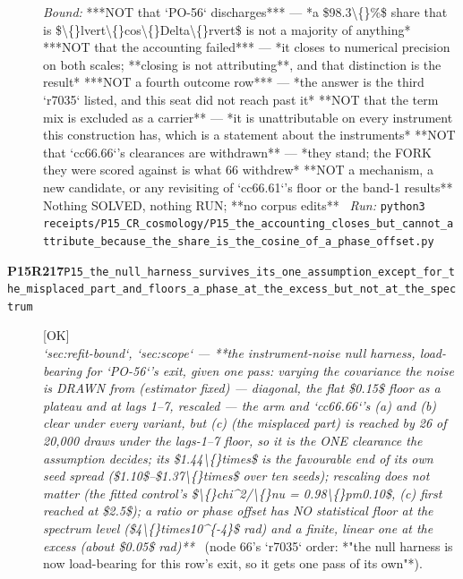 \begin{description}
 \emph{Bound:}  ***NOT that `PO-56` discharges*** --- *a \$98.3\textbackslash\{\}\%\$ share that is \$\textbackslash\{\}lvert\textbackslash\{\}cos\textbackslash\{\}Delta\textbackslash\{\}rvert\$ is not a majority of anything*  ***NOT that the accounting failed*** --- *it closes to numerical precision on both scales; **closing is not attributing**, and that distinction is the result*  ***NOT a fourth outcome row*** --- *the answer is the third `r7035` listed, and this seat did not reach past it*  **NOT that the term mix is excluded as a carrier** --- *it is unattributable on every instrument this construction has, which is a statement about the instruments*  **NOT that `cc66.66`'s clearances are withdrawn** --- *they stand; the FORK they were scored against is what 66 withdrew*  **NOT a mechanism, a new candidate, or any revisiting of `cc66.61`'s floor or the band-1 results**  Nothing SOLVED, nothing RUN; **no corpus edits**
\ \emph{Run:} \texttt{python3 receipts/P15\_CR\_cosmology/P15\_the\_accounting\_closes\_but\_cannot\_attribute\_because\_the\_share\_is\_the\_cosine\_of\_a\_phase\_offset.py}
\item[\rcptlabel{P15_the_null_harness_survives_its_one_assumption_except_for_the_misplaced_part_and_floors_a_phase_at_the_excess_but_not_at_the_spectrum}{P15R217}\textbf{P15R217}\quad\texttt{P15\_the\_null\_harness\_survives\_its\_one\_assumption\_except\_for\_the\_misplaced\_part\_and\_floors\_a\_phase\_at\_the\_excess\_but\_not\_at\_the\_spectrum}]\hfill\textsf{[OK]}\\
\textit{`sec:refit-bound`, `sec:scope` --- **the instrument-noise null harness, load-bearing for `PO-56`'s exit, given one pass: varying the covariance the noise is DRAWN from (estimator fixed) --- diagonal, the flat \$0.15\$ floor as a plateau and at lags 1--7, rescaled --- the arm and `cc66.66`'s (a) and (b) clear under every variant, but (c) (the misplaced part) is reached by 26 of 20,000 draws under the lags-1--7 floor, so it is the ONE clearance the assumption decides; its \$1.44\textbackslash\{\}times\$ is the favourable end of its own seed spread (\$1.10\$--\$1.37\textbackslash\{\}times\$ over ten seeds); rescaling does not matter (the fitted control's \$\textbackslash\{\}chi\textasciicircum{}2/\textbackslash\{\}nu = 0.98\textbackslash\{\}pm0.10\$, (c) first reached at \$2.5\$); a ratio or phase offset has NO statistical floor at the spectrum level (\$4\textbackslash\{\}times10\textasciicircum{}\{-4\}\$ rad) and a finite, linear one at the excess (about \$0.05\$ rad)**} \ (node 66's `r7035` order: *"the null harness is now load-bearing for this row's exit, so it gets one pass of its own"*). 

\end{description}
